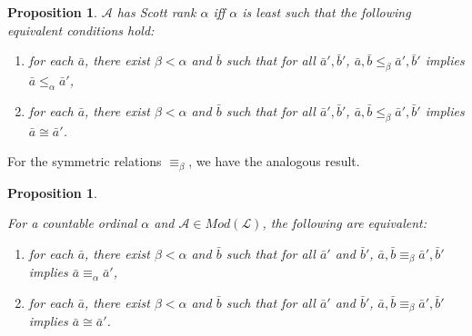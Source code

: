 \documentclass[10pt,a4paper]{article}
\newtheorem{prop}[thm]{Proposition}
\theoremstyle{definition}
\begin{document}
	\begin{prop}
		
		$\mathcal{A}$ has Scott rank $\alpha$ iff $\alpha$ is least such that the following equivalent conditions hold:
		
		\begin{enumerate}
			
			\item for each $\bar{a}$, there exist $\beta < \alpha$ and $\bar{b}$ such that for all $\bar{a}',\bar{b}'$, $\bar{a},\bar{b}\leq_\beta \bar{a}',\bar{b}'$ implies $\bar{a}\leq_\alpha\bar{a}'$, 
			
			\item for each $\bar{a}$, there exist $\beta < \alpha$ and $\bar{b}$ such that for all 
			$\bar{a}',\bar{b}'$, $\bar{a},\bar{b}\leq_\beta\bar{a}',\bar{b}'$ implies $\bar{a}\cong\bar{a}'$. 
			
		\end{enumerate}
		
	\end{prop}
	
	For the symmetric relations $\equiv_\beta$, we have the analogous result.
	
	\begin{prop}
		\label{prop5}
		
		For a countable ordinal $\alpha$ and $\mathcal{A}\in Mod(\mathcal{L})$, the following are equivalent:
		
		\begin{enumerate}
			
			\item for each $\bar{a}$, there exist $\beta < \alpha$ and $\bar{b}$ such that for all $\bar{a}'$ and 
			$\bar{b}'$, $\bar{a},\bar{b}\equiv_\beta\bar{a}',\bar{b}'$ implies $\bar{a}\equiv_\alpha\bar{a}'$,
			
			\item for each $\bar{a}$, there exist $\beta < \alpha$ and $\bar{b}$ such that for all $\bar{a}'$ and 
			$\bar{b}'$, $\bar{a},\bar{b}\equiv_\beta\bar{a}',\bar{b}'$ implies $\bar{a}\cong\bar{a}'$.
			
		\end{enumerate}
		
	\end{prop}
	
\end{document}
